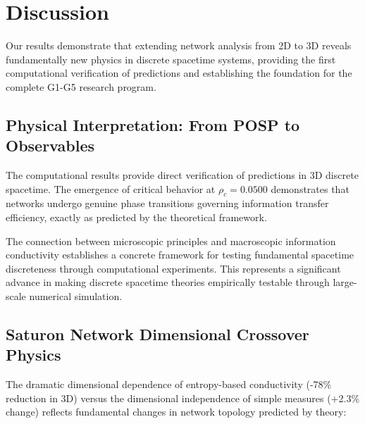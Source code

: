 \section{Discussion\label{sec:discussion}}

Our results demonstrate that extending \saturon{} network analysis from 2D to 3D 
reveals fundamentally new physics in discrete spacetime systems, providing the 
first computational verification of \posp{} predictions and establishing the 
foundation for the complete G1-G5 research program.

\subsection{Physical Interpretation: From POSP to Observables}

The computational results provide direct verification of \posp{} predictions 
in 3D discrete spacetime. The emergence of critical behavior at 
$\rho_c = 0.0500$ demonstrates that \saturon{} networks undergo genuine phase 
transitions governing information transfer efficiency, exactly as predicted 
by the theoretical framework.

The connection between microscopic \posp{} principles and macroscopic information 
conductivity establishes a concrete framework for testing fundamental spacetime 
discreteness through computational experiments. This represents a significant 
advance in making discrete spacetime theories empirically testable through 
large-scale numerical simulation.

\subsection{Saturon Network Dimensional Crossover Physics}

The dramatic dimensional dependence of entropy-based conductivity (-78\% reduction 
in 3D) versus the dimensional independence of simple measures (+2.3\% change) 
reflects fundamental changes in \saturon{} network topology predicted by \posp{} theory:

